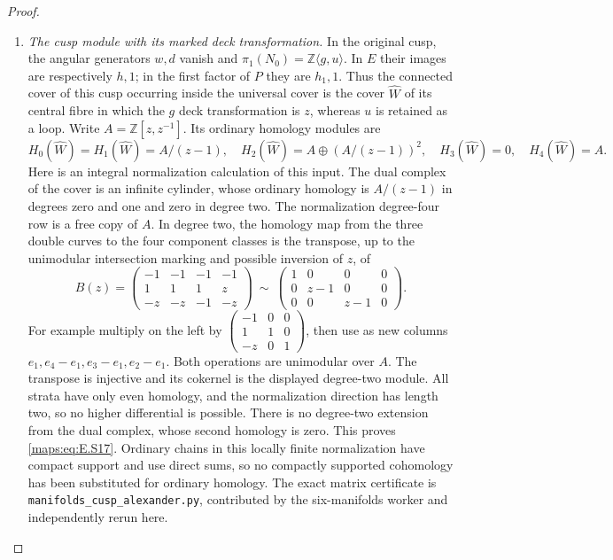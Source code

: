 \begin{proof}
\begin{enumerate}[label=\arabic*.,leftmargin=*]
\item \emph{The cusp module with its marked deck transformation.}
In the original cusp, the angular generators $w,d$ vanish and
$\pi_1(N_0)=\mathbb Z\langle g,u\rangle$. In $E$ their images
are respectively $h,1$; in the first factor of $P$ they are
$h_1,1$. Thus the connected cover of this cusp occurring inside
the universal cover is the cover $\widehat W$ of its central
fibre in which the $g$ deck transformation is $z$, whereas $u$
is retained as a loop. Write $A=\mathbb Z[z,z^{-1}]$.
Its ordinary homology modules are
\[
 H_0(\widehat W)=H_1(\widehat W)=A/(z-1),\quad
 H_2(\widehat W)=A\oplus(A/(z-1))^2,
 \quad H_3(\widehat W)=0,\quad H_4(\widehat W)=A.
 \tag{E.S17}\label{maps:eq:E.S17}
\]
Here is an integral normalization calculation of this input.
The dual complex of the cover is an infinite cylinder, whose
ordinary homology is $A/(z-1)$ in degrees zero and one and zero
in degree two. The normalization degree-four row is a free
copy of $A$. In degree two, the homology map from the three
double curves to the four component classes is the transpose,
up to the unimodular intersection marking and possible inversion
of $z$, of
\[
 B(z)=\begin{pmatrix}
 -1&-1&-1&-1\\ 1&1&1&z\\-z&-z&-1&-z
 \end{pmatrix}
 \ \sim\
 \begin{pmatrix}1&0&0&0\\0&z-1&0&0\\0&0&z-1&0\end{pmatrix}.
 \tag{E.S18}\label{maps:eq:E.S18}
\]
For example multiply on the left by
$\left(\begin{smallmatrix}-1&0&0\\1&1&0\\-z&0&1\end{smallmatrix}\right)$,
then use as new columns $e_1,e_4-e_1,e_3-e_1,e_2-e_1$.
Both operations are unimodular over $A$. The transpose is
injective and its cokernel is the displayed degree-two module.
All strata have only even homology, and the normalization
direction has length two, so no higher differential is possible.
There is no degree-two extension from the dual complex, whose
second homology is zero. This proves \eqref{maps:eq:E.S17}. Ordinary chains
in this locally finite normalization have compact support and
use direct sums, so no compactly supported cohomology has been
substituted for ordinary homology. The exact matrix certificate
is \texttt{manifolds\_cusp\_alexander.py}, contributed by the
six-manifolds worker and independently rerun here.


\end{enumerate}
\end{proof}
